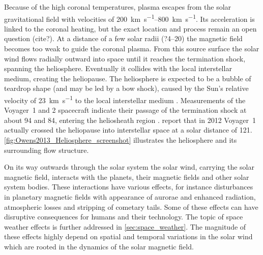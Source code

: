 Because of the high coronal temperatures, plasma escapes from the solar gravitational field \citep{Parker1958} with velocities of \SIrange{200}{800}{\km\per\s}. Its acceleration is linked to the coronal heating, but the exact location and process remain an open question (cite?). At a distance of a few solar radii (?4--20) the magnetic field becomes too weak to guide the coronal plasma. From this source surface the solar wind flows radially outward into space until it reaches the termination shock, spanning the heliosphere. Eventually it collides with the local interstellar medium, creating the heliopause. The heliosphere is expected to be a bubble of teardrop shape (and may be led by a bow shock), caused by the Sun's relative velocity of \SI{23}{\km\per\s} to the local interstellar medium \citep{Owens2013}. Measurements of the Voyager~1 and 2 spacecraft indicate their passage of the termination shock at about \SI{94}{\au} and \SI{84}{\au}, entering the heliosheath region \citep{Owens2013}. \citet{Gurnett2013} report that in 2012 Voyager~1 actually crossed the heliopause into interstellar space at a solar distance of \SI{121}{\au}. \autoref{fig:Owens2013_Heliosphere_screenshot} illustrates the heliosphere and its surrounding flow structure.\\
\begin{figure}[htb]
\end{figure}

On its way outwards through the solar system the solar wind, carrying the solar magnetic field, interacts with the planets, their magnetic fields and other solar system bodies. These interactions have various effects, for instance disturbances in planetary magnetic fields with appearance of aurorae and enhanced radiation, atmospheric losses and stripping of cometary tails. Some of these effects can have disruptive consequences for humans and their technology. The topic of space weather effects is further addressed in \autoref{sec:space_weather}. The magnitude of these effects highly depend on spatial and temporal variations in the solar wind which are rooted in the dynamics of the solar magnetic field.\\

